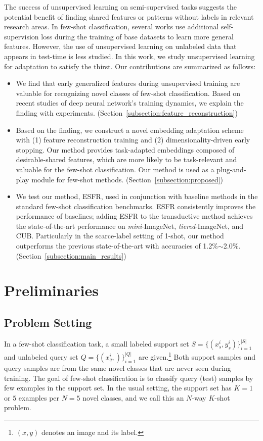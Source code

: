 \documentclass{article}
\begin{document}
The success of unsupervised learning on semi-supervised tasks suggests the potential benefit of finding shared features or patterns without labels in relevant research areas. In few-shot classification, several works \cite{Gidaris_2019_ICCV, self_eccv} use additional self-supervision loss during the training of base datasets to learn more general features. However, the use of unsupervised learning on unlabeled data that appears in test-time is less studied. In this work, we study unsupervised learning for adaptation to satisfy the thirst.
\newpage
Our contributions are summarized as follows:
\begin{itemize}
	\item We find that early generalized features during unsupervised training are valuable for recognizing novel classes of few-shot classification. Based on recent studies of deep neural network's training dynamics, we explain the finding with experiments.
	(Section~\ref{subsection:feature_reconstruction})
	
	\item Based on the finding, we construct a novel embedding adaptation scheme with (1) feature reconstruction training and (2) dimensionality-driven early stopping. Our method provides task-adapted embeddings composed of desirable-shared features, which are more likely to be task-relevant and valuable for the few-shot classification. Our method is used as a plug-and-play module for few-shot methods.
	(Section~\ref{subsection:proposed})
	
	\item We test our method, ESFR, used in conjunction with baseline methods in the standard few-shot classification benchmarks. ESFR consistently improves the performance of baselines; adding ESFR to the transductive method achieves the state-of-the-art performance on \textit{mini}-ImageNet, \textit{tiered}-ImageNet, and CUB.
	Particularly in the scarce-label setting of 1-shot, our method outperforms the previous state-of-the-art with accuracies of 1.2\%$\sim$2.0\%. (Section~\ref{subsection:main_results})
\end{itemize} \section{Preliminaries}
\subsection{Problem Setting}
In a few-shot classification task, a small labeled support set $S=\{(x^i_s,y^i_s)\}_{i=1}^{|S|}$ and unlabeled query set $Q=\{(x^i_q,)\}_{i=1}^{|Q|}$ are given.\footnote{$(x,y)$ denotes an image and its label.}
Both support samples and query samples are from the same novel classes that are never seen during training.
The goal of few-shot classification is to classify query (test) samples by few examples in the support set.
In the usual setting, the support set has $K=1$ or $5$ examples per $N=5$ novel classes, and we call this an $N$-way $K$-shot problem.
\end{document}
